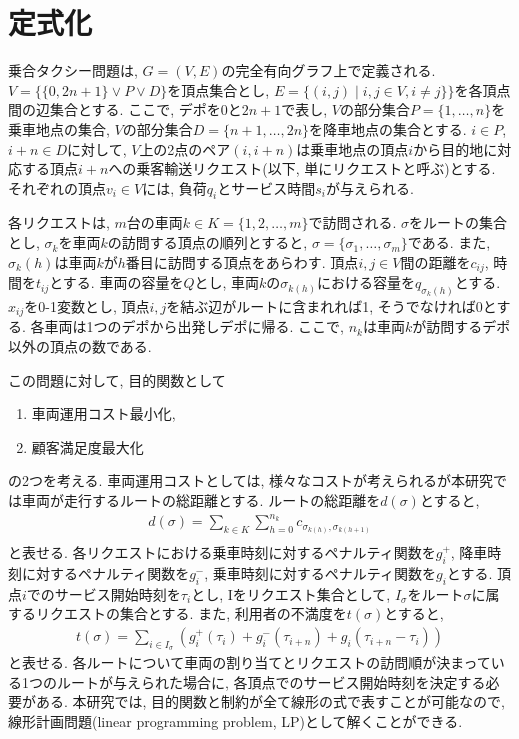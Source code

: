 \chapter{定式化}\label{formulation}
乗合タクシー問題は, $G = (V, E)$の完全有向グラフ上で定義される. $V =\{\{0,2n+1\} \lor P \lor D\}$を頂点集合とし, $E = \{(i,j) \mid i,j\in V ,i \neq j\}\}$を各頂点間の辺集合とする.
ここで, デポを$0$と$2n+1$で表し, $V$の部分集合$P =\{1,\ldots,n \}$を乗車地点の集合, $V$の部分集合$D =\{n+1,\ldots,2n \}$を降車地点の集合とする.
$i \in P$, $i+n \in D$に対して, $V$上の2点のペア$(i,i+n)$は乗車地点の頂点$i$から目的地に対応する頂点$i+n$への乗客輸送リクエスト(以下, 単にリクエストと呼ぶ)とする.
それぞれの頂点$v_i \in V$には, 負荷$q_i$とサービス時間$s_i$が与えられる.

各リクエストは, $m$台の車両$k \in K = \{1,2,\ldots,m\}$で訪問される.
$\sigma$をルートの集合とし, $\sigma_k$を車両$k$の訪問する頂点の順列とすると, $\sigma = \{\sigma_1,\ldots,\sigma_m\}$である. また, $\sigma_k(h)$は車両$k$が$h$番目に訪問する頂点をあらわす.
頂点$i,j \in V$間の距離を$c_{ij}$, 時間を$t_{ij}$とする.
車両の容量を$Q$とし, 車両$k$の$\sigma _{k(h)}$における容量を$q_{\sigma_k(h)}$とする.
$x_{ij}$を0-1変数とし, 頂点$i,j$を結ぶ辺がルートに含まれれば1, そうでなければ0とする.
各車両は1つのデポから出発しデポに帰る. ここで, $n_k$は車両$k$が訪問するデポ以外の頂点の数である.

この問題に対して, 目的関数として
\begin{enumerate}
 \item 車両運用コスト最小化,
 \item 顧客満足度最大化
\end{enumerate}
の2つを考える. 車両運用コストとしては, 様々なコストが考えられるが本研究では車両が走行するルートの総距離とする. ルートの総距離を$d(\sigma)$とすると,
\begin{align*}
d(\sigma) = \sum_ {k\in K} \sum_{h=0}^{n_k} c_ {\sigma_{k(h)},\sigma_ {k(h+1)} }\\
\end{align*}
と表せる.
各リクエストにおける乗車時刻に対するペナルティ関数を$g^+_i$, 降車時刻に対するペナルティ関数を$g^-_i$, 乗車時刻に対するペナルティ関数を$g_i$とする.
頂点$i$でのサービス開始時刻を$\tau_i$とし, Iをリクエスト集合として, $I_\sigma$をルート$\sigma$に属するリクエストの集合とする.
また, 利用者の不満度を$t(\sigma)$とすると,
\begin{align*}
t(\sigma) = \sum_ {i \in I_\sigma} (g^+_i(\tau_i)+g^-_i(\tau_{i+n})+g_i(\tau_{i+n}-\tau_i))
\end{align*}
と表せる. 各ルートについて車両の割り当てとリクエストの訪問順が決まっている1つのルートが与えられた場合に, 各頂点でのサービス開始時刻を決定する必要がある. 本研究では, 目的関数と制約が全て線形の式で表すことが可能なので, 線形計画問題(linear programming problem, LP)として解くことができる.

